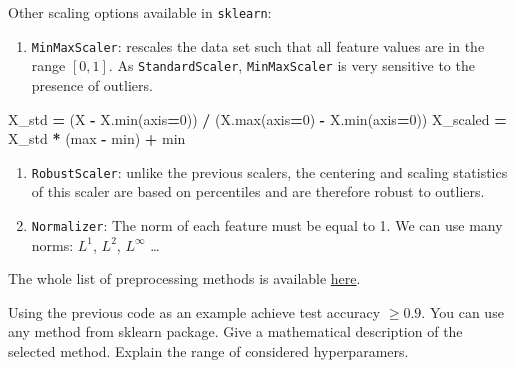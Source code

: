 \documentclass[10pt,a4paper]{article}
\newenvironment{Shaded}{\begin{snugshade}}{\end{snugshade}}
\newcommand{\BuiltInTok}[1]{#1}
\newcommand{\DecValTok}[1]{\textcolor[rgb]{0.00,0.00,0.81}{#1}}
\newcommand{\NormalTok}[1]{#1}
\newcommand{\OperatorTok}[1]{\textcolor[rgb]{0.81,0.36,0.00}{\textbf{#1}}}
\providecommand{\tightlist}{%
  \setlength{\parskip}{0pt}
  }
\theoremstyle{break}
\begin{document}
Other scaling options available in \texttt{sklearn}:

\begin{enumerate}
\def\labelenumi{\arabic{enumi}.}
\tightlist
\item
  \texttt{MinMaxScaler}: rescales the data set such that all feature values are in the range \([0, 1]\). As \texttt{StandardScaler}, \texttt{MinMaxScaler} is very sensitive to the presence of outliers.
\end{enumerate}

\begin{Shaded}
\begin{Highlighting}[]
\NormalTok{X_std }\OperatorTok{=}\NormalTok{ (X }\OperatorTok{-}\NormalTok{ X.}\BuiltInTok{min}\NormalTok{(axis}\OperatorTok{=}\DecValTok{0}\NormalTok{)) }\OperatorTok{/}\NormalTok{ (X.}\BuiltInTok{max}\NormalTok{(axis}\OperatorTok{=}\DecValTok{0}\NormalTok{) }\OperatorTok{-}\NormalTok{ X.}\BuiltInTok{min}\NormalTok{(axis}\OperatorTok{=}\DecValTok{0}\NormalTok{))}
\NormalTok{X_scaled }\OperatorTok{=}\NormalTok{ X_std }\OperatorTok{*}\NormalTok{ (}\BuiltInTok{max} \OperatorTok{-} \BuiltInTok{min}\NormalTok{) }\OperatorTok{+} \BuiltInTok{min}
\end{Highlighting}
\end{Shaded}

\begin{enumerate}
\def\labelenumi{\arabic{enumi}.}
\setcounter{enumi}{1}
\tightlist
\item
  \texttt{RobustScaler}: unlike the previous scalers, the centering and scaling statistics of this scaler are based on percentiles and are therefore robust to outliers.
\item
  \texttt{Normalizer}: The norm of each feature must be equal to 1. We can use many norms: \(L^1\), \(L^2\), \(L^\infty\) \ldots{}
\end{enumerate}

The whole list of preprocessing methods is available \href{https://scikit-learn.org/stable/modules/classes.html\#module-sklearn.preprocessing}{here}.

\begin{tcolorbox}

Using the previous code as an example achieve test accuracy \(\geq 0.9\). You can use any method from sklearn package. Give a mathematical description of the selected method. Explain the range of considered hyperparamers.

\end{tcolorbox}
\end{document}
